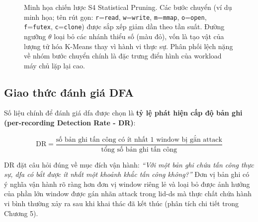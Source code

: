 \documentclass[../main.tex]{subfiles}
\begin{document}
\begin{figure}[H]
  \caption{Minh họa chiến lược S4 Statistical Pruning. Các bước
    chuyển (ví dụ minh
      họa; tên rút gọn: \texttt{r}=\texttt{read},
      \texttt{w}=\texttt{write}, \texttt{m}=\texttt{mmap},
      \texttt{o}=\texttt{open}, \texttt{f}=\texttt{futex},
    \texttt{c}=\texttt{clone}) được
    sắp xếp giảm dần theo tần suất. Đường ngưỡng $\theta$ loại bỏ các
    nhánh thiểu số (màu
    đỏ), vốn là tạo vật của lượng tử hóa K-Means thay vì hành vi thực
    sự. Phân phối lệch
    nặng về nhóm bước chuyển chính là đặc trưng điển hình của workload
  máy chủ lặp lại cao.}
  \label{fig:s4_pruning}
\end{figure}

\subsection{Giao thức đánh giá DFA}
\label{sec:dfa_eval_protocol}

Số liệu chính để đánh giá \gls{dfa} được chọn là \textbf{tỷ lệ phát hiện
  cấp độ bản ghi
(per-recording Detection Rate - DR)}:

\begin{equation}
  \label{eq:dr}
  \text{DR} = \frac{\text{số bản ghi tấn công có ít nhất 1 window bị
  gắn attack}}
  {\text{tổng số bản ghi tấn công}}
\end{equation}

DR đặt câu hỏi đúng về mục đích vận hành: \textit{``Với một bản ghi
  chứa tấn công thực
sự, \gls{dfa} có bắt được ít nhất một khoảnh khắc tấn công không?''} Đơn vị
bản ghi có ý
nghĩa vận hành rõ ràng hơn đơn vị window riêng lẻ và loại bỏ được ảnh
hưởng của phần
lớn window được gán nhãn attack trong \gls{lid-ds} mà thực chất chứa hành
vi bình thường xảy
ra sau khi khai thác đã kết thúc (phân tích chi tiết trong Chương 5).
\end{document}
